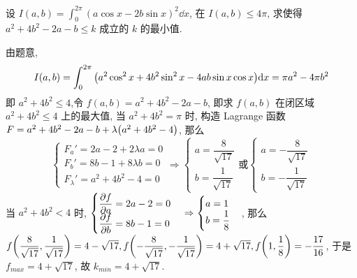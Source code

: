\begin{example}
    设 $I(a,b)=\displaystyle \int_{0}^{2\pi} (a\cos x-2b\sin x)^2 \dd x$, 在 $I(a,b)\leqslant 4\pi$, 求使得 $a^2+4b^2-2a-b\leqslant k$ 成立的 $k$ 的最小值.
\end{example}
\begin{solution}
    由题意, 
    $$
    I(a,b)=\int_{0}^{2\pi} \qty(a^2\cos^2x+4b^2\sin^2x-4ab \sin x\cos x) \dd x=\pi a^2-4\pi b^2
    $$
    即 $a^2+4b^2\leqslant 4$,令 $f(a,b)=a^2+4b^2-2a-b$, 即求 $f(a,b)$ 在闭区域 $a^2+4b^2\leqslant 4$ 上的最大值, 当 $a^2+4b^2=\pi$ 时, 构造 Lagrange 函数 $F=a^2+4b^2-2a-b+\lambda\qty(a^2+4b^2-4)$, 那么 
    $$
    \begin{cases}
        F_a'=2a-2+2\lambda a=0 \\
        F_b'=8b-1+8\lambda b=0 \\ 
        F_\lambda'=a^2+4b^2-4=0
    \end{cases}\Rightarrow \begin{cases}
        a=\dfrac{8}{\sqrt{17}} \\[6pt]
        b=\dfrac{1}{\sqrt{17}}
    \end{cases}\text{或}
    \begin{cases}
        a=-\dfrac{8}{\sqrt{17}} \\[6pt]
        b=-\dfrac{1}{\sqrt{17}}
    \end{cases}
    $$
    当 $a^2+4b^2<4$ 时, $\begin{cases}
        \displaystyle \pdv{f}{a}=2a-2=0\\ 
        \displaystyle \pdv{f}{b}=8b-1=0
    \end{cases}\Rightarrow \begin{cases}
        a=1\\ 
        b=\dfrac{1}{8}
    \end{cases}$, 那么 $f\qty(\dfrac{8}{\sqrt{17}},\dfrac{1}{\sqrt{17}})=4-\sqrt{17}, f\qty(-\dfrac{8}{\sqrt{17}},-\dfrac{1}{\sqrt{17}})=4+\sqrt{17}, f\qty(1,\dfrac{1}{8})=-\dfrac{17}{16}$, 于是 $f_{max}=4+\sqrt{17}$, 故 $k_{min}=4+\sqrt{17}.$
\end{solution}